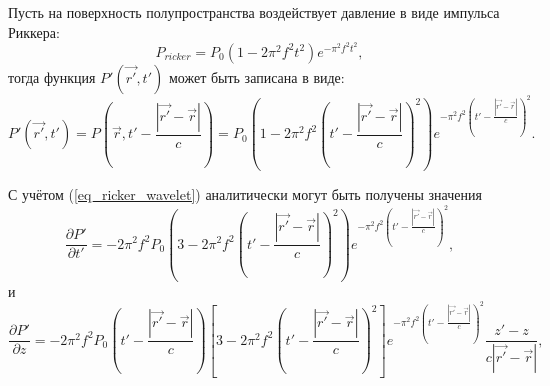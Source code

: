 \documentclass{article}
\begin{document}
Пусть на поверхность полупространства воздействует давление в виде импульса Риккера:
\begin{equation}
\label{eq_ricker_wavelet}
P_{ricker} = P_0(1-2 \pi^2f^2t^2)e^{-\pi^2f^2t^2},
\end{equation}
тогда функция $P'(\vec{r'}, t')$ может быть записана в виде:
\begin{equation}
\label{eq_surface_pressure}
P'(\vec{r'}, t') = P(\vec{r}, t' - \frac{|\vec{r'} - \vec{r}|}{c}) = P_0(1-2 \pi^2f^2(t' - \frac{|\vec{r'} - \vec{r}|}{c})^2)e^{-\pi^2f^2(t'-\frac{|\vec{r'} - \vec{r}|}{c})^2}.
\end{equation}

С учётом (\ref{eq_ricker_wavelet}) аналитически могут быть получены значения
\begin{equation}
\label{eq_dp'_dt'}
\frac{\partial P'}{\partial t'} = -2\pi^2f^2P_0(3-2 \pi^2f^2(t' - \frac{|\vec{r'} - \vec{r}|}{c})^2)e^{-\pi^2f^2(t' - \frac{|\vec{r'} - \vec{r}|}{c})^2},
\end{equation}
и
\begin{equation}
\label{eq_dp'_dz}
\frac{\partial P'}{\partial z} = -2\pi^2f^2P_0(t' - \frac{|\vec{r'} - \vec{r}|}{c})[3-2 \pi^2f^2(t' - \frac{|\vec{r'} - \vec{r}|}{c})^2]e^{-\pi^2f^2(t' - \frac{|\vec{r'} - \vec{r}|}{c})^2}
\frac{z'-z}{c|\vec{r'}-\vec{r}|},
\end{equation}
\end{document}
